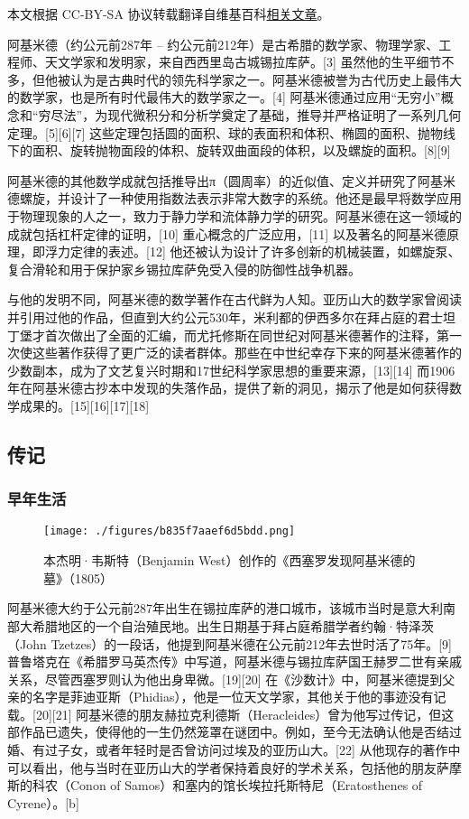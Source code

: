 
本文根据 CC-BY-SA 协议转载翻译自维基百科\href{https://en.wikipedia.org/wiki/Archimedes}{相关文章}。

阿基米德（约公元前287年 – 约公元前212年）是古希腊的数学家、物理学家、工程师、天文学家和发明家，来自西西里岛古城锡拉库萨。[3] 虽然他的生平细节不多，但他被认为是古典时代的领先科学家之一。阿基米德被誉为古代历史上最伟大的数学家，也是所有时代最伟大的数学家之一。[4] 阿基米德通过应用“无穷小”概念和“穷尽法”，为现代微积分和分析学奠定了基础，推导并严格证明了一系列几何定理。[5][6][7] 这些定理包括圆的面积、球的表面积和体积、椭圆的面积、抛物线下的面积、旋转抛物面段的体积、旋转双曲面段的体积，以及螺旋的面积。[8][9]

阿基米德的其他数学成就包括推导出π（圆周率）的近似值、定义并研究了阿基米德螺旋，并设计了一种使用指数法表示非常大数字的系统。他还是最早将数学应用于物理现象的人之一，致力于静力学和流体静力学的研究。阿基米德在这一领域的成就包括杠杆定律的证明，[10] 重心概念的广泛应用，[11] 以及著名的阿基米德原理，即浮力定律的表述。[12] 他还被认为设计了许多创新的机械装置，如螺旋泵、复合滑轮和用于保护家乡锡拉库萨免受入侵的防御性战争机器。

与他的发明不同，阿基米德的数学著作在古代鲜为人知。亚历山大的数学家曾阅读并引用过他的作品，但直到大约公元530年，米利都的伊西多尔在拜占庭的君士坦丁堡才首次做出了全面的汇编，而尤托修斯在同世纪对阿基米德著作的注释，第一次使这些著作获得了更广泛的读者群体。那些在中世纪幸存下来的阿基米德著作的少数副本，成为了文艺复兴时期和17世纪科学家思想的重要来源，[13][14] 而1906年在阿基米德古抄本中发现的失落作品，提供了新的洞见，揭示了他是如何获得数学成果的。[15][16][17][18]
\subsection{传记}  
\subsubsection{早年生活}
\begin{figure}[ht]
\centering
\texttt{[image: ./figures/b835f7aaef6d5bdd.png]}
\caption{本杰明·韦斯特（Benjamin West）创作的《西塞罗发现阿基米德的墓》（1805）} \label{fig_Archim_1}
\end{figure}
阿基米德大约于公元前287年出生在锡拉库萨的港口城市，该城市当时是意大利南部大希腊地区的一个自治殖民地。出生日期基于拜占庭希腊学者约翰·特泽茨（John Tzetzes）的一段话，他提到阿基米德在公元前212年去世时活了75年。[9] 普鲁塔克在《希腊罗马英杰传》中写道，阿基米德与锡拉库萨国王赫罗二世有亲戚关系，尽管西塞罗则认为他出身卑微。[19][20] 在《沙数计》中，阿基米德提到父亲的名字是菲迪亚斯（Phidias），他是一位天文学家，其他关于他的事迹没有记载。[20][21] 阿基米德的朋友赫拉克利德斯（Heracleides）曾为他写过传记，但这部作品已遗失，使得他的一生仍然笼罩在谜团中。例如，至今无法确认他是否结过婚、有过子女，或者年轻时是否曾访问过埃及的亚历山大。[22] 从他现存的著作中可以看出，他与当时在亚历山大的学者保持着良好的学术关系，包括他的朋友萨摩斯的科农（Conon of Samos）和塞内的馆长埃拉托斯特尼（Eratosthenes of Cyrene）。[b]
